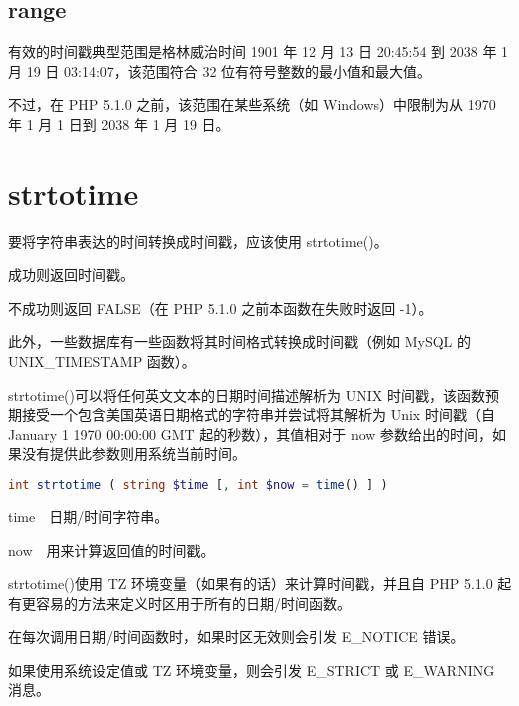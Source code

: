 \subsection{range}

有效的时间戳典型范围是格林威治时间 1901 年 12 月 13 日 20:45:54 到 2038 年 1 月 19 日 03:14:07，该范围符合 32 位有符号整数的最小值和最大值。

不过，在 PHP 5.1.0 之前，该范围在某些系统（如 Windows）中限制为从 1970 年 1 月 1 日到 2038 年 1 月 19 日。

\section{strtotime}


要将字符串表达的时间转换成时间戳，应该使用 strtotime()。

\begin{compactitem}
\item 成功则返回时间戳。
\item 不成功则返回 FALSE（在 PHP 5.1.0 之前本函数在失败时返回 -1）。
\end{compactitem}

此外，一些数据库有一些函数将其时间格式转换成时间戳（例如 MySQL 的UNIX\_TIMESTAMP 函数）。

strtotime()可以将任何英文文本的日期时间描述解析为 UNIX 时间戳，该函数预期接受一个包含美国英语日期格式的字符串并尝试将其解析为 Unix 时间戳（自 January 1 1970 00:00:00 GMT 起的秒数），其值相对于 now 参数给出的时间，如果没有提供此参数则用系统当前时间。



\begin{lstlisting}[language=PHP]
int strtotime ( string $time [, int $now = time() ] )
\end{lstlisting}

\begin{compactitem}
\item time~~日期/时间字符串。
\item now~~用来计算返回值的时间戳。
\end{compactitem}

strtotime()使用 TZ 环境变量（如果有的话）来计算时间戳，并且自 PHP 5.1.0 起有更容易的方法来定义时区用于所有的日期/时间函数。

\begin{compactitem}
\item 在每次调用日期/时间函数时，如果时区无效则会引发 E\_NOTICE 错误。
\item 如果使用系统设定值或 TZ 环境变量，则会引发 E\_STRICT 或 E\_WARNING 消息。
\end{compactitem}

